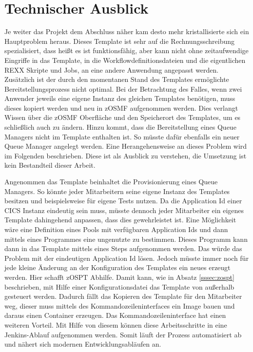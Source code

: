 \section{Technischer Ausblick}\label{sec:techaus}
Je weiter das Projekt dem Abschluss näher kam desto mehr kristallisierte sich ein Hauptproblem heraus.
Dieses Template ist sehr auf die Rechnungsschreibung spezialisiert, dass heißt es ist funktionsfähig, aber kann nicht ohne zeitaufwendige Eingriffe in das Template, in die Workflowdefinitionsdateien und die eigentlichen REXX Skripte und Jobs, an eine andere Anwendung angepasst werden.
Zusätzlich ist der durch den momentanen Stand des Templates ermöglichte Bereitstellungsprozess nicht optimal.
Bei der Betrachtung des Falles, wenn zwei Anwender jeweils eine eigene Instanz des gleichen Templates benötigen, muss dieses kopiert werden und neu in zOSMF aufgenommen werden.
Dies verlangt Wissen über die zOSMF Oberfläche und den Speicherort des Templates, um es schließlich auch zu ändern.
Hinzu kommt, dass die Bereitstellung eines Queue Managers nicht im Template enthalten ist.
So müsste dafür ebenfalls ein neuer Queue Manager angelegt werden.
Eine Herangehensweise an dieses Problem wird im Folgenden beschrieben.
Diese ist als Ausblick zu verstehen, die Umsetzung ist kein Bestandteil dieser Arbeit.

Angenommen das Template beinhaltet die Provisionierung eines Queue Managers.
So könnte jeder Mitarbeitern seine eigene Instanz des Templates besitzen und beispielsweise für eigene Tests nutzen.
Da die Application Id einer CICS Instanz eindeutig sein muss, müsste dennoch jeder Mitarbeiter ein eigenes Template dahingehend anpassen, dass dies gewehrleistet ist.
Eine Möglichkeit wäre eine Definition eines Pools mit verfügbaren Application Ids und dann mittels eines Programmes eine ungenutzte zu bestimmen.
Dieses Programm kann dann in das Template mittels eines Steps aufgenommen werden.
Das würde das Problem mit der eindeutigen Application Id lösen.
Jedoch müsste immer noch für jede kleine Änderung an der Konfiguration des Templates ein neues erzeugt werden.
Hier schafft zOSPT Abhilfe.
Damit kann, wie in Absatz \ref{sssec:zospt} beschrieben, mit Hilfe einer Konfigurationsdatei das Template von außerhalb gesteuert werden.
Dadurch fällt das Kopieren des Template für den Mitarbeiter weg, dieser muss mittels des Kommandozeileninterfaces ein Image bauen und daraus einen Container erzeugen.
Das Kommandozeileninterface hat einen weiteren Vorteil.
Mit Hilfe von diesem können diese Arbeitsschritte in eine Jenkins-Ablauf aufgenommen werden.
Somit läuft der Prozess automatisiert ab und nähert sich modernen Entwicklungsabläufen an.

